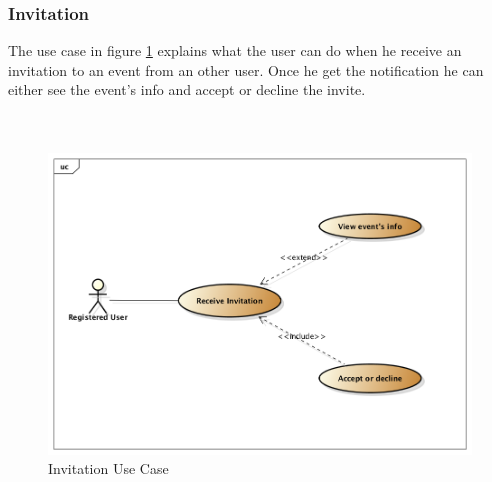 \subsubsection{Invitation}
The use case in figure \ref{fig:invitusecase} explains what the user can do when he receive an invitation to an event from an other user. Once he get the notification he can either see the event's info and accept or decline the invite.\\\\\\
 \begin{center}
 \begin{figure}[H]
    \includegraphics[width=1\textwidth]{../UMLDiagram/use_case/Invitation/Invitation.png}
    \caption{Invitation Use Case}
     \label{fig:invitusecase}
     \end{figure}
   \end{center}  
